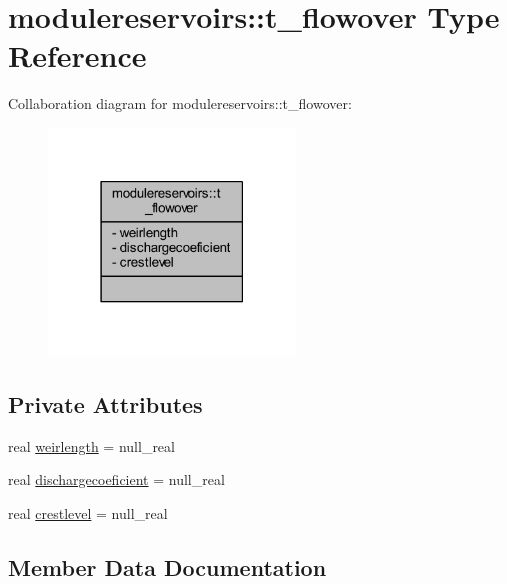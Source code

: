\hypertarget{structmodulereservoirs_1_1t__flowover}{}\section{modulereservoirs\+:\+:t\+\_\+flowover Type Reference}
\label{structmodulereservoirs_1_1t__flowover}


Collaboration diagram for modulereservoirs\+:\+:t\+\_\+flowover\+:\nopagebreak
\begin{figure}[H]
\begin{center}
\leavevmode
\includegraphics[width=186pt]{structmodulereservoirs_1_1t__flowover__coll__graph}
\end{center}
\end{figure}
\subsection*{Private Attributes}
\begin{DoxyCompactItemize}
\item 
real \mbox{\hyperlink{structmodulereservoirs_1_1t__flowover_a05d7947991a94084b3738b99f29d4e9f}{weirlength}} = null\+\_\+real
\item 
real \mbox{\hyperlink{structmodulereservoirs_1_1t__flowover_ad583ba7aeb7ee351d5ae4e0e1bd1e001}{dischargecoeficient}} = null\+\_\+real
\item 
real \mbox{\hyperlink{structmodulereservoirs_1_1t__flowover_a8f68750dc1ce59ab47e788faefe3c79f}{crestlevel}} = null\+\_\+real
\end{DoxyCompactItemize}


\subsection{Member Data Documentation}
\mbox{\label{structmodulereservoirs_1_1t__flowover_a8f68750dc1ce59ab47e788faefe3c79f}} 
